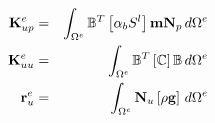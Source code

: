\documentclass[twoside]{report} %
\def\g{\mathbf g}
\def\K{\mathbf{K}}
\def\r{\mathbf r}
\def\B{\mathbb{B}}
\def\m{\mathbf m}
\begin{document}

\begin{eqnarray}
\K^e_{up}
&=&
\int_{\Domain^e} 
\B^T
\left[
\alpha_b S^l
\right]
\m\SFVPressure
\,
d\Domain^e
\nonumber
\\
\K^e_{uu}
&=&
\int_{\Domain^e} 
\B^T
\left[
\mathbb C
\right]
\B
\,
d\Domain^e
\nonumber
\\
\r^e_{u}
&=&
\int_{\Domain^e} 
\TFVDisp
\left[
\rho\g
\right]
\,
d\Domain^e
\end{eqnarray}


\end{document}
